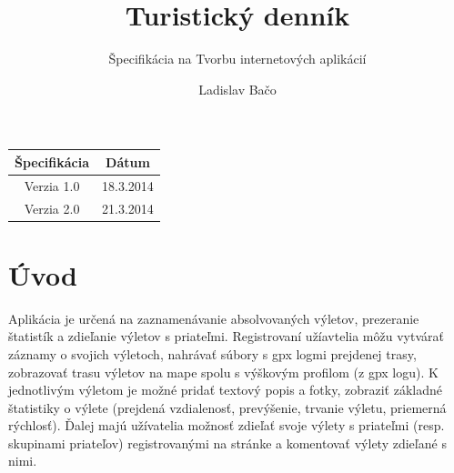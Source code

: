 \documentclass[12pt,a4paper]{scrartcl}
\begin{document}
\title{Turistický denník}
\subtitle{Špecifikácia na Tvorbu internetových aplikácií}
\author{Ladislav Bačo}
\maketitle
\bigskip
{}

\vfil
\begin{center}
	\begin{tabular}{|c|c|}
		\hline
		\bf Špecifikácia & \bf Dátum \\
		\hline
		Verzia 1.0 & 18.3.2014 \\
		\hline
		Verzia 2.0 & 21.3.2014 \\
		\hline
	\end{tabular}
\end{center}
\thispagestyle{empty}

\newpage
\section{Úvod}
Aplikácia je určená na zaznamenávanie absolvovaných výletov, prezeranie štatistík a zdieľanie výletov s priateľmi. Registrovaní užíavtelia môžu vytvárať záznamy o svojich výletoch, nahrávať súbory s gpx logmi prejdenej trasy, zobrazovať trasu výletov na mape spolu s výškovým profilom (z gpx logu). K jednotlivým výletom je možné pridať textový popis a fotky, zobraziť základné štatistiky o výlete (prejdená vzdialenosť, prevýšenie, trvanie výletu, priemerná rýchlosť). Ďalej majú užívatelia možnosť zdieľať svoje výlety s priateľmi (resp. skupinami priateľov) registrovanými na stránke a komentovať výlety zdieľané s nimi.
\end{document}
